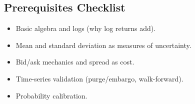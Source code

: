 \documentclass[11pt]{article}
\begin{document}
    \subsection{Prerequisites Checklist}

    \begin{itemize}
        \item Basic algebra and logs (why log returns add).
        \item Mean and standard deviation as measures of uncertainty.
        \item Bid/ask mechanics and spread as cost.
        \item Time-series validation (purge/embargo, walk-forward).
        \item Probability calibration.
    \end{itemize}
\end{document}
